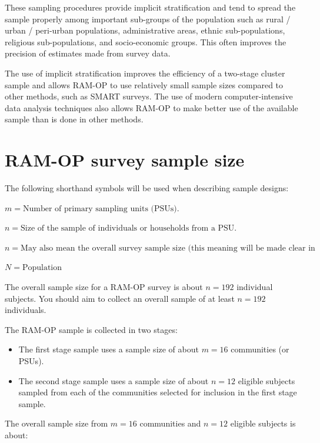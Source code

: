 \documentclass[12pt,]{book}
\providecommand{\tightlist}{%
  \setlength{\itemsep}{0pt}\setlength{\parskip}{0pt}}
\theoremstyle{definition}
\theoremstyle{definition}
\theoremstyle{definition}
\theoremstyle{remark}
\begin{document}
These sampling procedures provide implicit stratification and tend to
spread the sample properly among important sub-groups of the population
such as rural / urban / peri-urban populations, administrative areas,
ethnic sub-populations, religious sub-populations, and socio-economic
groups. This often improves the precision of estimates made from survey
data.

The use of implicit stratification improves the efficiency of a
two-stage cluster sample and allows RAM-OP to use relatively small
sample sizes compared to other methods, such as SMART surveys. The use
of modern computer-intensive data analysis techniques also allows RAM-OP
to make better use of the available sample than is done in other
methods.

\newpage

\hypertarget{ram-op-survey-sample-size}{%
\section{RAM-OP survey sample size}\label{ram-op-survey-sample-size}}

The following shorthand symbols will be used when describing sample
designs:

\(m = \text{Number of primary sampling units (PSUs).}\)

\(n = \text{Size of the sample of individuals or households from a PSU.}\)

\(n = \text{May also mean the overall survey sample size (this meaning will be made clear in the text).}\)

\(N = \text{Population}\)

The overall sample size for a RAM-OP survey is about \(n = 192\)
individual subjects. You should aim to collect an overall sample of at
least \(n = 192\) individuals.

The RAM-OP sample is collected in two stages:

\begin{itemize}
\tightlist
\item
  The first stage sample uses a sample size of about \(m = 16\)
  communities (or PSUs).
\item
  The second stage sample uses a sample size of about \(n = 12\)
  eligible subjects sampled from each of the communities selected for
  inclusion in the first stage sample.
\end{itemize}

The overall sample size from \(m = 16\) communities and \(n = 12\)
eligible subjects is about:
\end{document}
